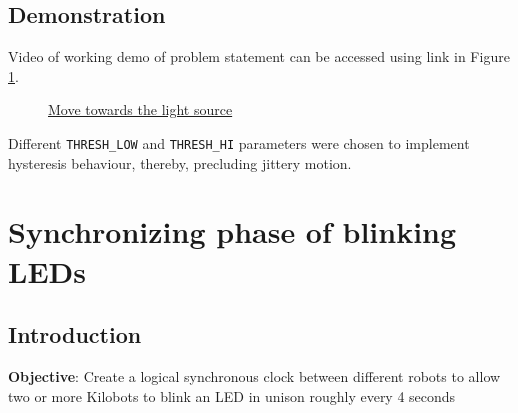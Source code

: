 \section{Demonstration}
Video of working demo of problem statement can be accessed using link in Figure \ref{fig:move_towards_the_light}.
\begin{figure}[H]
	\centering
	\caption{\href{https://www.google.com/url?sa=j&url=https\%3A\%2F\%2Fphotos.app.goo.gl\%2FnUNghDg4nJygpzUu5&uct=1551610784&usg=G0tZGJ7iMN79F5qGk1QMw5rfodM.}{Move towards the light source}}
	\label{fig:move_towards_the_light}
\end{figure}
Different \texttt{THRESH\_LOW} and \texttt{THRESH\_HI} parameters were chosen to implement hysteresis behaviour, thereby, precluding jittery motion.


\chapter{Synchronizing phase of blinking LEDs}
\section{Introduction}
\textbf{Objective}: Create a logical synchronous clock between different 
robots to allow two or more Kilobots to blink an LED in unison roughly every 4 seconds \\

